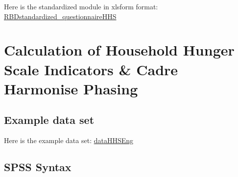 \documentclass[
]{book}
\begin{document}
Here is the standardized module in xlsform format:
\href{https://github.com/WFP-VAM/RBD_FS_CH_guide_EN/blob/master/questionnaires/RBDstandardized_questionnaireHHS.docx}{RBDstandardized\_questionnaireHHS}

\hypertarget{calculation-of-household-hunger-scale-indicators-cadre-harmonise-phasing}{%
\section{Calculation of Household Hunger Scale Indicators \& Cadre Harmonise Phasing}\label{calculation-of-household-hunger-scale-indicators-cadre-harmonise-phasing}}

\hypertarget{example-data-set}{%
\subsection{Example data set}\label{example-data-set}}

Here is the example data set:
\href{https://github.com/WFP-VAM/RBD_FS_CH_guide_EN/blob/master/example_datasets/dataHHSEng.sav}{dataHHSEng}

\hypertarget{spss-syntax}{%
\subsection{SPSS Syntax}\label{spss-syntax}}
\end{document}
